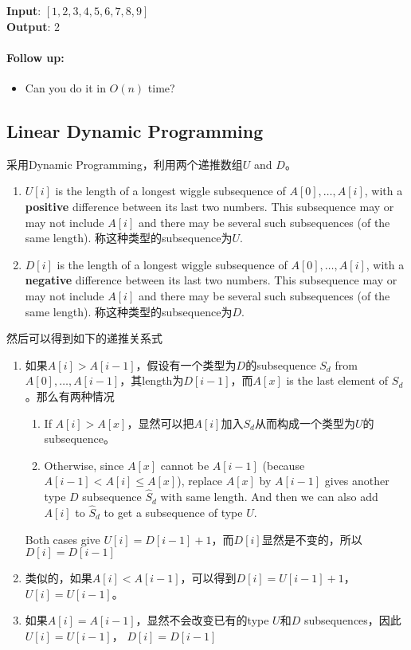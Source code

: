 \begin{flushleft}
\textbf{Input}: $ [1,2,3,4,5,6,7,8,9] $
\\
\textbf{Output}: 2
\end{flushleft}

\paragraph{Follow up:}
\begin{itemize}
\item Can you do it in $ O(n) $ time?
\end{itemize}

\subsection{Linear Dynamic Programming}
采用Dynamic Programming，利用两个递推数组$U$ and $D$。
\begin{enumerate}
\item $U[i]$ is the length of a longest wiggle subsequence of $A[0],\ldots,A[i]$, with a \textbf{positive} difference between its last two numbers. This subsequence may or may not include $A[i]$ and there may be several such subsequences (of the same length). 称这种类型的subsequence为$U$.
\item $D[i]$ is the length of a longest wiggle subsequence of $A[0],\ldots,A[i]$, with a \textbf{negative} difference between its last two numbers. This subsequence may or may not include $A[i]$ and there may be several such subsequences (of the same length). 称这种类型的subsequence为$D$.
\end{enumerate}
然后可以得到如下的递推关系式
\begin{enumerate}
\item 如果$A[i]>A[i-1]$，假设有一个类型为$D$的subsequence $S_d$ from $A[0],\ldots,A[i-1]$，其length为$D[i-1]$，而$A[x]$ is the last element of $S_d$。那么有两种情况
\begin{enumerate}
\item If $A[i] > A[x]$，显然可以把$A[i]$加入$S_d$从而构成一个类型为$U$的subsequence。
\item Otherwise, since $A[x]$ cannot be $A[i-1]$ (because $A[i-1] < A[i]\leq A[x]$), replace $A[x]$ by $A[i-1]$ gives another type $D$ subsequence $\hat{S}_d$ with same length. And then we can also add $A[i]$ to $\hat{S}_d$ to get a subsequence of type $U$.
\end{enumerate}
Both cases give $U[i]=D[i-1]+1$，而$D[i]$显然是不变的，所以$D[i] = D[i-1]$
\item 类似的，如果$A[i] < A[i-1]$，可以得到$D[i] = U[i-1]+1$，$U[i]=U[i-1]$。
\item 如果$A[i]=A[i-1]$，显然不会改变已有的type $U$和$D$ subsequences，因此$U[i]=U[i-1]$， $D[i]=D[i-1]$
\end{enumerate}

